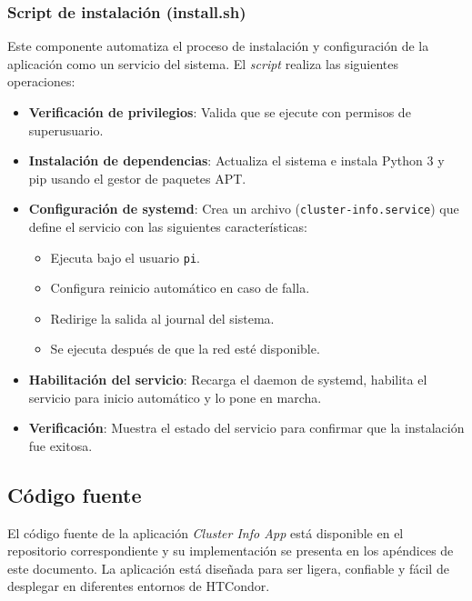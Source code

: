\subsubsection{Script de instalación (install.sh)}
\noindent

Este componente automatiza el proceso de instalación y configuración de la aplicación como un servicio del sistema. El \textit{script} realiza las siguientes operaciones:

\begin{itemize}
	\item \textbf{Verificación de privilegios}: Valida que se ejecute con permisos de superusuario.
	
	\item \textbf{Instalación de dependencias}: Actualiza el sistema e instala Python 3 y pip usando el gestor de paquetes APT.
	
	\item \textbf{Configuración de systemd}: Crea un archivo (\texttt{cluster-info.service}) que define el servicio con las siguientes características:
	\begin{itemize}
		\item Ejecuta bajo el usuario \texttt{pi}.
		\item Configura reinicio automático en caso de falla.
		\item Redirige la salida al journal del sistema.
		\item Se ejecuta después de que la red esté disponible.
	\end{itemize}
	
	\item \textbf{Habilitación del servicio}: Recarga el daemon de systemd, habilita el servicio para inicio automático y lo pone en marcha.
	
	\item \textbf{Verificación}: Muestra el estado del servicio para confirmar que la instalación fue exitosa.
\end{itemize}

\subsection{Código fuente}
\noindent

El código fuente de la aplicación \textit{Cluster Info App} está disponible en el repositorio correspondiente y su implementación se presenta en los apéndices de este documento. La aplicación está diseñada para ser ligera, confiable y fácil de desplegar en diferentes entornos de HTCondor.

